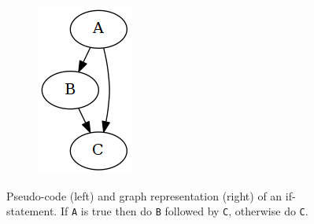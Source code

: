 \begin{figure}[htbp]
\begin{subfigure}[ht]{0.10\textwidth}
		\includegraphics[width=\textwidth]{poster/inc/if.png}
	\end{subfigure}
	\caption{Pseudo-code (left) and graph representation (right) of an if-statement. If \texttt{A} is true then do \texttt{B} followed by \texttt{C}, otherwise do \texttt{C}.\label{fig:graphs_and_primitives}}
\end{figure}


